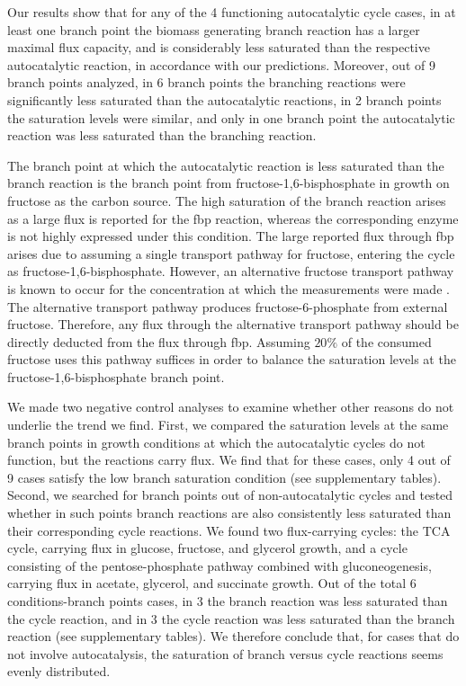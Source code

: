     Our results show that for any of the 4 functioning autocatalytic cycle cases, in at least one branch point the biomass generating branch reaction has a larger maximal flux capacity, and is considerably less saturated than the respective autocatalytic reaction, in accordance with our predictions.
    Moreover, out of 9 branch points analyzed, in 6 branch points the branching reactions were significantly less saturated than the autocatalytic reactions, in 2 branch points the saturation levels were similar, and only in one branch point the autocatalytic reaction was less saturated than the branching reaction.

    The branch point at which the autocatalytic reaction is less saturated than the branch reaction is the branch point from fructose-1,6-bisphosphate in growth on fructose as the carbon source.
    The high saturation of the branch reaction arises as a large flux is reported for the fbp reaction, whereas the corresponding enzyme is not highly expressed under this condition.
    The large reported flux through fbp arises due to assuming a single transport pathway for fructose, entering the cycle as fructose-1,6-bisphosphate.
    However, an alternative fructose transport pathway is known to occur for the concentration at which the measurements were made \cite{Kornberg1990-ft}.
    The alternative transport pathway produces fructose-6-phosphate from external fructose.
    Therefore, any flux through the alternative transport pathway should be directly deducted from the flux through fbp.
    Assuming $20\%$ of the consumed fructose uses this pathway suffices in order to balance the saturation levels at the fructose-1,6-bisphosphate branch point.

    We made two negative control analyses to examine whether other reasons do not underlie the trend we find.
    First, we compared the saturation levels at the same branch points in growth conditions at which the autocatalytic cycles do not function, but the reactions carry flux.
    We find that for these cases, only 4 out of 9 cases satisfy the low branch saturation condition (see supplementary tables).
    Second, we searched for branch points out of non-autocatalytic cycles and tested whether in such points branch reactions are also consistently less saturated than their corresponding cycle reactions.
    We found two flux-carrying cycles: the TCA cycle, carrying flux in glucose, fructose, and glycerol growth, and a cycle consisting of the pentose-phosphate pathway combined with gluconeogenesis, carrying flux in acetate, glycerol, and succinate growth.
    Out of the total 6 conditions-branch points cases, in 3 the branch reaction was less saturated than the cycle reaction, and in 3 the cycle reaction was less saturated than the branch reaction (see supplementary tables).
    We therefore conclude that, for cases that do not involve autocatalysis, the saturation of branch versus cycle reactions seems evenly distributed.


